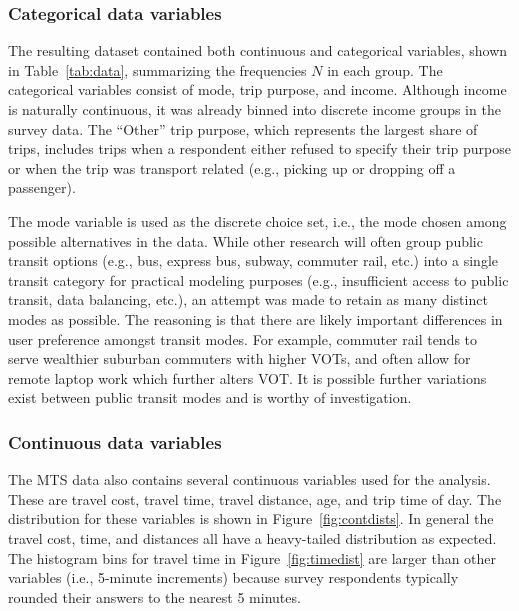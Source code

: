 \documentclass[numbered]{trbunofficial}\usepackage[]{graphicx}\usepackage[]{color}
\begin{document}
\begin{table}[H]
\end{table}

\subsubsection{Categorical data variables}
The resulting dataset contained both continuous and categorical variables, shown in Table~\ref{tab:data}, summarizing the frequencies $N$ in each group. The categorical variables consist of mode, trip purpose, and income. Although income is naturally continuous, it was already binned into discrete income groups in the survey data. The ``Other'' trip purpose, which represents the largest share of trips, includes trips when a respondent either refused to specify their trip purpose or when the trip was transport related (e.g., picking up or dropping off a passenger). 


The mode variable is used as the discrete choice set, i.e., the mode chosen among possible alternatives in the data. While other research will often group public transit options (e.g., bus, express bus, subway, commuter rail, etc.) into a single transit category for practical modeling purposes (e.g., insufficient access to public transit, data balancing, etc.), an attempt was made to retain as many distinct modes as possible. The reasoning is that there are likely important differences in user preference amongst transit modes. For example, commuter rail tends to serve wealthier suburban commuters with higher VOTs, and often allow for remote laptop work which further alters VOT. It is possible further variations exist between public transit modes and is worthy of investigation. 

\subsubsection{Continuous data variables}
The MTS data also contains several continuous variables used for the analysis. These are travel cost, travel time, travel distance, age, and trip time of day. The distribution for these variables is shown in Figure~\ref{fig:contdists}. In general the travel cost, time, and distances all have a heavy-tailed distribution as expected. The histogram bins for travel time in Figure~\ref{fig:timedist} are larger than other variables (i.e., 5-minute increments) because survey respondents typically rounded their answers to the nearest 5 minutes.
\end{document}
